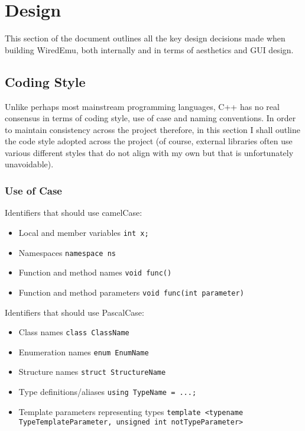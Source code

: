\section{Design}

This section of the document outlines all the key design decisions made when building WiredEmu, both internally and in terms of aesthetics and GUI design.

\subsection{Coding Style}
    Unlike perhaps most mainstream programming languages, C++ has no real consensus in terms of coding style, use of case and naming conventions. In order to maintain consistency across the project therefore, in this section I shall outline the code style adopted across the project (of course, external libraries often use various different styles that do not align with my own but that is unfortunately unavoidable).

    \subsubsection{Use of Case}
        Identifiers that should use camelCase:
        \begin{itemize}
            \item Local and member variables \texttt{int x;}
            \item Namespaces \texttt{namespace ns}
            \item Function and method names \texttt{void func()}
            \item Function and method parameters \texttt{void func(int parameter)}
        \end{itemize}

        Identifiers that should use PascalCase:
        \begin{itemize}
            \item Class names \texttt{class ClassName}
            \item Enumeration names \texttt{enum EnumName}
            \item Structure names \texttt{struct StructureName}
            \item Type definitions/aliases \texttt{using TypeName = ...;}
            \item Template parameters representing types \texttt{template <typename TypeTemplateParameter, unsigned int notTypeParameter>}
        \end{itemize}

